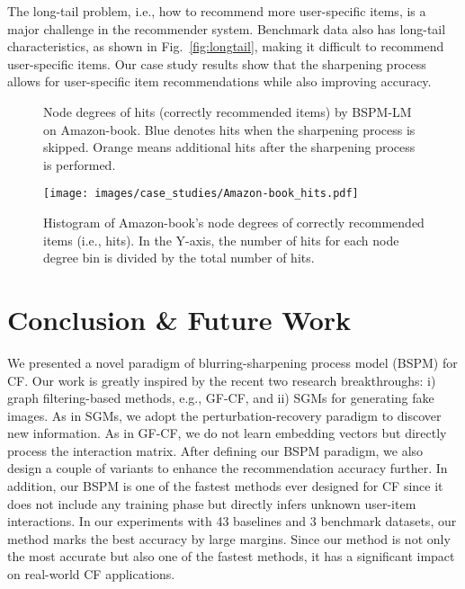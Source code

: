 \documentclass[sigconf,natbib=true]{acmart}
\begin{document}
The long-tail problem, i.e., how to recommend more user-specific items, is a major challenge in the recommender system. Benchmark data also has long-tail characteristics, as shown in Fig.~\ref{fig:longtail}, making it difficult to recommend user-specific items. Our case study results show that the sharpening process allows for user-specific item recommendations while also improving accuracy.

\begin{figure}[t]
    \centering
{}
    \caption{Node degrees of hits (correctly recommended items) by BSPM-LM on Amazon-book. Blue denotes hits when the sharpening process is skipped. Orange means additional hits after the sharpening process is performed.}
\label{fig:case_study}
\end{figure}

\begin{figure}[t]
    \centering
\texttt{[image: images/case\_studies/Amazon-book\_hits.pdf]}
    \caption{Histogram of Amazon-book's node degrees of correctly recommended items (i.e., hits). In the Y-axis, the number of hits for each node degree bin is divided by the total number of hits.}
\label{fig:case_study_all}
\end{figure}

\section{Conclusion \& Future Work}
We presented a novel paradigm of blurring-sharpening process model (BSPM) for CF. Our work is greatly inspired by the recent two research breakthroughs: i) graph filtering-based methods, e.g., GF-CF, and ii) SGMs for generating fake images. As in SGMs, we adopt the perturbation-recovery paradigm to discover new information. As in GF-CF, we do not learn embedding vectors but directly process the interaction matrix. After defining our BSPM paradigm, we also design a couple of variants to enhance the recommendation accuracy further. In addition, our BSPM is one of the fastest methods ever designed for CF since it does not include any training phase but directly infers unknown user-item interactions. In our experiments with 43 baselines and 3 benchmark datasets, our method marks the best accuracy by large margins. Since our method is not only the most accurate but also one of the fastest methods, it has a significant impact on real-world CF applications.
\end{document}
